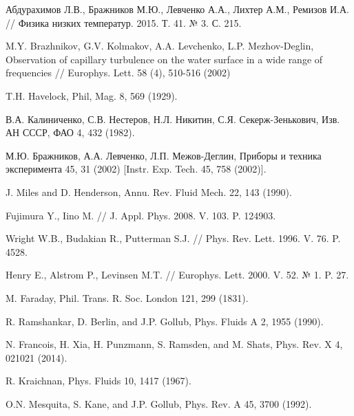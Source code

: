 \begin{thebibliography}{99}
Абдурахимов Л.В., Бражников М.Ю., Левченко А.А., Лихтер А.М., Ремизов И.А. // Физика низких температур. 2015. Т. 41. № 3. С. 215.


M.Y. Brazhnikov, G.V. Kolmakov, A.A. Levchenko, L.P. Mezhov-Deglin, Observation of capillary turbulence on the water surface in a wide range of frequencies // Europhys. Lett. 58 (4), 510-516 (2002)


T.H. Havelock, Phil, Mag. 8, 569 (1929).

В.А. Калиниченко, С.В. Нестеров, Н.Л. Никитин, С.Я. Секерж-Зенькович, Изв. АН СССР, ФАО 4, 432 (1982).

М.Ю. Бражников, А.А. Левченко, Л.П. Межов-Деглин, Приборы и техника эксперимента 45, 31 (2002) [Instr. Exp. Tech. 45, 758 (2002)].

J. Miles and D. Henderson, Annu. Rev. Fluid Mech. 22, 143 (1990).

Fujimura Y., Iino M. // J. Appl. Phys. 2008. V. 103. P. 124903.

Wright W.B., Budakian R., Putterman S.J. // Phys. Rev. Lett. 1996. V. 76. P. 4528.

Henry E., Alstrom P., Levinsen M.T. // Europhys. Lett. 2000. V. 52. № 1. P. 27.




M. Faraday, Phil. Trans. R. Soc. London 121, 299 (1831).

R. Ramshankar, D. Berlin, and J.P. Gollub, Phys. Fluids A 2, 1955 (1990).


N. Francois, H. Xia, H. Punzmann, S. Ramsden, and M. Shats, Phys. Rev. X 4, 021021 (2014).

R. Kraichnan, Phys. Fluids 10, 1417 (1967).

O.N. Mesquita, S. Kane, and J.P. Gollub, Phys. Rev. A 45, 3700 (1992).


\end{thebibliography}
